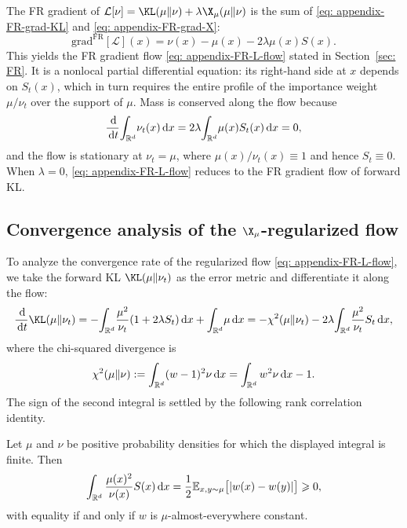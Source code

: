 \documentclass{article}
\begin{document}
The FR gradient of $\mathcal L[\nu]=\KL(\mu\|\nu)+\lambda\X_\mu(\mu\|\nu)$ is the sum of \eqref{eq: appendix-FR-grad-KL} and \eqref{eq: appendix-FR-grad-X}:
\begin{equation*}
    \mathrm{grad}^{\mathrm{FR}}[\mathcal L](x) = \nu(x) - \mu(x) - 2\lambda \mu(x) S(x).
\end{equation*}
This yields the FR gradient flow \eqref{eq: appendix-FR-L-flow} stated in Section~\ref{sec: FR}. It is a nonlocal partial differential equation: its right-hand side at $x$ depends on $S_t(x)$, which in turn requires the entire profile of the importance weight $\mu/\nu_t$ over the support of $\mu$. Mass is conserved along the flow because
\begin{equation*}
    \frac{\,\mathrm d}{\,\mathrm d t}\!\int_{\mathbb R^d}\!\nu_t(x) \,\mathrm d x = 2\lambda\!\int_{\mathbb R^d}\!\mu(x) S_t(x) \,\mathrm d x = 0,
\end{equation*}
and the flow is stationary at $\nu_t = \mu$, where $\mu(x)/\nu_t(x) \equiv 1$ and hence $S_t\equiv 0$. When $\lambda = 0$, \eqref{eq: appendix-FR-L-flow} reduces to the FR gradient flow of forward KL.

\subsection{Convergence analysis of the \texorpdfstring{$\X_\mu$}{X-mu}-regularized flow}
\label{subsec: appendix-FR-convergence}

To analyze the convergence rate of the regularized flow \eqref{eq: appendix-FR-L-flow}, we take the forward KL $\KL(\mu\|\nu_t)$ as the error metric and differentiate it along the flow:
\begin{equation*}
    \frac{\D}{\D t}\KL(\mu\|\nu_t) = -\!\int_{\mathbb R^d}\!\frac{\mu^2}{\nu_t}(1 + 2\lambda S_t) \D x + \int_{\mathbb R^d}\!\mu \D x = -\chi^2(\mu\|\nu_t) - 2\lambda\!\int_{\mathbb R^d}\!\frac{\mu^2}{\nu_t} S_t \D x,
\end{equation*}
where the chi-squared divergence is
\begin{equation*}
    \chi^2(\mu\|\nu) := \int_{\mathbb R^d}(w-1)^2\nu\,\mathrm d x = \int_{\mathbb R^d} w^2\nu\,\mathrm d x - 1.
\end{equation*}
The sign of the second integral is settled by the following rank correlation identity.

\begin{lemma}
\label{lem: appendix-rankcorrelation}
Let $\mu$ and $\nu$ be positive probability densities for which the displayed integral is finite. Then
\begin{equation*}
    \int_{\mathbb R^d}\frac{\mu(x)^2}{\nu(x)}S(x)\,\mathrm d x = \frac{1}{2} \mathbb E_{x,y\sim\mu}\bigl[|w(x) - w(y)|\bigr] \geqslant 0,
\end{equation*}
with equality if and only if $w$ is $\mu$-almost-everywhere constant.
\end{lemma}
\end{document}
